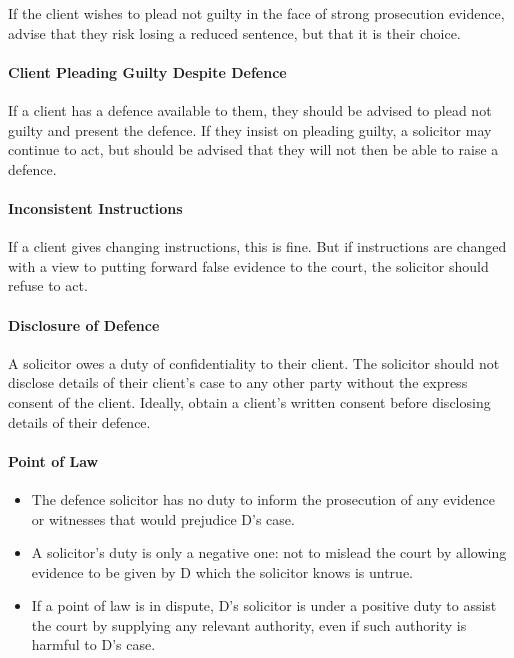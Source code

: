 \documentclass[
]{article}
\providecommand{\tightlist}{%
  \setlength{\itemsep}{0pt}\setlength{\parskip}{0pt}}
\begin{document}
If the client wishes to plead not guilty in the face of strong
prosecution evidence, advise that they risk losing a reduced sentence,
but that it is their choice.

\hypertarget{client-pleading-guilty-despite-defence}{%
\paragraph{Client Pleading Guilty Despite
Defence}\label{client-pleading-guilty-despite-defence}}

If a client has a defence available to them, they should be advised to
plead not guilty and present the defence. If they insist on pleading
guilty, a solicitor may continue to act, but should be advised that they
will not then be able to raise a defence.

\hypertarget{inconsistent-instructions}{%
\paragraph{Inconsistent Instructions}\label{inconsistent-instructions}}

If a client gives changing instructions, this is fine. But if
instructions are changed with a view to putting forward false evidence
to the court, the solicitor should refuse to act.

\hypertarget{disclosure-of-defence}{%
\paragraph{Disclosure of Defence}\label{disclosure-of-defence}}

A solicitor owes a duty of confidentiality to their client. The
solicitor should not disclose details of their client's case to any
other party without the express consent of the client. Ideally, obtain a
client's written consent before disclosing details of their defence.

\hypertarget{point-of-law}{%
\paragraph{Point of Law}\label{point-of-law}}

\begin{itemize}
\tightlist
\item
  The defence solicitor has no duty to inform the prosecution of any
  evidence or witnesses that would prejudice D's case.
\item
  A solicitor's duty is only a negative one: not to mislead the court by
  allowing evidence to be given by D which the solicitor knows is
  untrue.
\item
  If a point of law is in dispute, D's solicitor is under a positive
  duty to assist the court by supplying any relevant authority, even if
  such authority is harmful to D's case.
\end{itemize}
\end{document}
